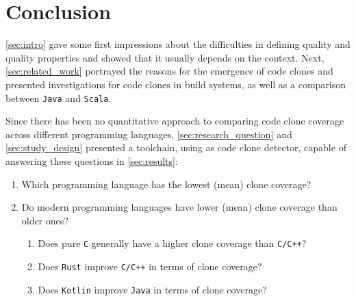 
\section{Conclusion}
\label{sec:conclusion}

\autoref{sec:intro} gave some first impressions about the difficulties in defining quality and quality properties and showed that it usually depends on the context. Next, \autoref{sec:related_work} portrayed the reasons for the emergence of code clones and presented investigations for code clones in build systems, as well as a comparison between \texttt{Java} and \texttt{Scala}.

Since there has been no quantitative approach to comparing code clone coverage across different programming languages, \autoref{sec:research_question} and \autoref{sec:study_design} presented a toolchain, using \teamscale{} as code clone detector, capable of answering these questions in \autoref{sec:results}:
\begin{enumerate}
	\item Which programming language has the lowest (mean) clone coverage?
	
	
	\item Do modern programming languages have lower (mean) clone coverage than older ones?
	
	
	\begin{enumerate}
		\item Does pure \texttt{C} generally have a higher clone coverage than \texttt{C/C++}?
		
		
		\item Does \texttt{Rust} improve \texttt{C/C++} in terms of clone coverage?
		
		
		\item Does \texttt{Kotlin} improve \texttt{Java} in terms of clone coverage?
		
	\end{enumerate}
\end{enumerate}

